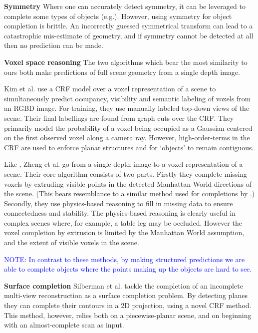\documentclass[10pt,twocolumn,letterpaper]{article}
\makeatletter
\renewcommand*{\eg}{e.g.\@\xspace}
\newcommand*{\ea}{et al.\@\xspace}
\newcommand{\note}[1]{\textcolor{blue}{NOTE: #1}}
\makeatother
\begin{document}
\noindent\textbf{Symmetry}
Where one can accurately detect symmetry, it can be leveraged to complete some types of objects (\eg \cite{law-cviu-2010, thrun-iccv-2005, kroemer-humanoids-2012}). 
However, using symmetry for object completion is brittle.
An incorrectly guessed symmetrical transform can lead to a catastrophic mis-estimate of geometry, and if symmetry cannot be detected at all then no prediction can be made.


\noindent\textbf{Voxel space reasoning}
The two algorithms which bear the most similarity to ours both make predictions of full scene geometry from a single depth image.

Kim \ea \cite{kim-iccv-2013} use a CRF model over a voxel representation of a scene to simultaneously predict occupancy, visibility and semantic labeling of voxels from an RGBD image. 
For training, they use manually labeled top-down views of the scene.
Their final labellings are found from graph cuts over the CRF.
They primarily model the probability of a voxel being occupied as a Gaussian centered on the first observed voxel along a camera ray.
However, high-order-terms in the CRF are used to enforce planar structures and for `objects' to remain contiguous.

Like \cite{kim-iccv-2013},  Zheng \ea \cite{zheng-cvpr-2013} go from a single depth image to a voxel representation of a scene.
Their core algorithm consists of two parts.
Firstly they complete missing voxels by extruding visible points in the detected Manhattan World directions of the scene.
(This bears resemblance to a similar method used for completions by \cite{kroemer-humanoids-2012}.)
Secondly, they use physics-based reasoning to fill in missing data to ensure connectedness and stability.
The physics-based reasoning is clearly useful in complex scenes where, for example, a table leg may be occluded.
However the voxel completion by extrusion is limited by the Manhattan World assumption, and the extent of visible voxels in the scene.

\note{In contrast to these methods, by making structured predictions we are able to complete objects where the points making up the objects are hard to see.}


\noindent\textbf{Surface completion}
Silberman \ea \cite{silberman-eccv-2014} tackle the completion of an incomplete multi-view reconstruction as a surface completion problem.
By detecting planes they can complete their contours in a 2D projection, using a novel CRF method.
This method, however, relies both on a piecewise-planar scene, and on beginning with an almost-complete scan as input.
\end{document}

